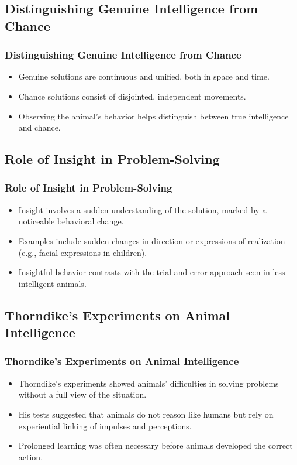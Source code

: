 \documentclass[10pt]{beamer}
\begin{document}
    \subsection{Distinguishing Genuine Intelligence from Chance}
    \begin{frame}
    \frametitle{Distinguishing Genuine Intelligence from Chance}
    \begin{itemize}
        \item Genuine solutions are continuous and unified, both in space and time.
        \item Chance solutions consist of disjointed, independent movements.
        \item Observing the animal's behavior helps distinguish between true intelligence and chance.
    \end{itemize}
    \end{frame}
    
    \subsection{Role of Insight in Problem-Solving}
    \begin{frame}
    \frametitle{Role of Insight in Problem-Solving}
    \begin{itemize}
        \item Insight involves a sudden understanding of the solution, marked by a noticeable behavioral change.
        \item Examples include sudden changes in direction or expressions of realization (e.g., facial expressions in children).
        \item Insightful behavior contrasts with the trial-and-error approach seen in less intelligent animals.
    \end{itemize}
    \end{frame}
    
    \subsection{Thorndike's Experiments on Animal Intelligence}
    \begin{frame}
    \frametitle{Thorndike's Experiments on Animal Intelligence}
    \begin{itemize}
        \item Thorndike's experiments showed animals' difficulties in solving problems without a full view of the situation.
        \item His tests suggested that animals do not reason like humans but rely on experiential linking of impulses and perceptions.
        \item Prolonged learning was often necessary before animals developed the correct action.
    \end{itemize}
    \end{frame}
    
\end{document}
